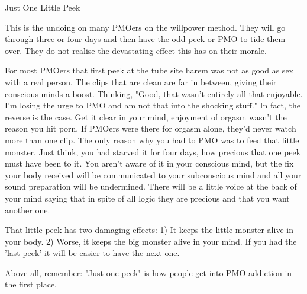 Just One Little Peek

This is the undoing on many PMOers on the willpower method. They will go through three or four days and then have the odd peek or PMO to tide them over. They do not realise the devastating effect this has on their morale. 

For most PMOers that first peek at the tube site harem was not as good as sex with a real person. The clips that are clean are far in between, giving their conscious minds a boost. Thinking, "Good, that wasn't entirely all that enjoyable. I'm losing the urge to PMO and am not that into the shocking stuff." In fact, the reverse is the case. Get it clear in your mind, enjoyment of orgasm wasn't the reason you hit porn. If PMOers were there for orgasm alone, they'd never watch more than one clip. The only reason why you had to PMO was to feed that little monster. Just think, you had starved it for four days, how precious that one peek must have been to it. You aren't aware of it in your conscious mind, but the fix your body received will be communicated to your subconscious mind and all your sound preparation will be undermined. There will be a little voice at the back of your mind saying that in spite of all logic they are precious and that you want another one.

That little peek has two damaging effects:
  1) It keeps the little monster alive in your body.
  2) Worse, it keeps the big monster alive in your mind. If you had the 'last peek' it will be easier to have the next one.

Above all, remember:
  \huge{"Just one peek" is how people get into PMO addiction in the first place.}
